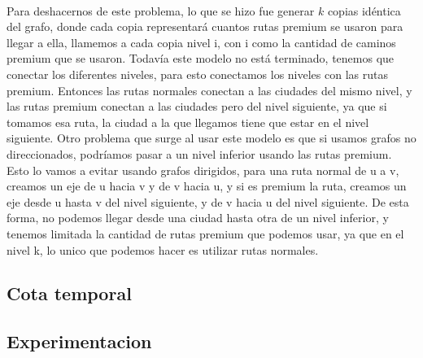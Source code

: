 \\
\par
Para deshacernos de este problema, lo que se hizo fue generar $k$ copias idéntica del grafo, donde cada copia representará cuantos rutas premium se usaron para llegar a ella, llamemos a cada copia nivel i, con i como la cantidad de caminos premium que se usaron. Todavía este modelo no está terminado, tenemos que conectar los diferentes niveles, para esto conectamos los niveles con las rutas premium. Entonces las rutas normales conectan a las ciudades del mismo nivel, y las rutas premium conectan a las ciudades pero del nivel siguiente, ya que si tomamos esa ruta, la ciudad a la que llegamos tiene que estar en el nivel siguiente.
Otro problema que surge al usar este modelo es que si usamos grafos no direccionados, podríamos pasar a un nivel inferior usando las rutas premium. Esto lo vamos a evitar usando grafos dirigidos, para una ruta normal de u a v, creamos un eje de u hacia v y de v hacia u, y si es premium la ruta, creamos un eje desde u hasta v del nivel siguiente, y de v hacia u del nivel siguiente. De esta forma, no podemos llegar desde una ciudad hasta otra de un nivel inferior, y tenemos limitada la cantidad de rutas premium que podemos usar, ya que en el nivel k, lo unico que podemos hacer es utilizar rutas normales.

\subsection{Cota temporal}

\subsection{Experimentacion}

\pagebreak